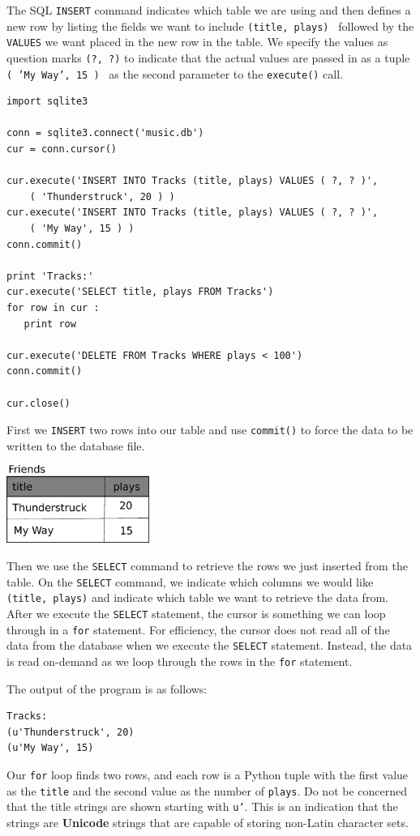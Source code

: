 \documentclass[10pt]{book}
\begin{document}
The SQL {\tt INSERT} command indicates which table we are using 
and then defines a new row by listing the fields we want to 
include {\tt (title, plays) } followed by the {\tt VALUES} we want
placed in the new row in the table.   We specify the values
as question marks {\tt (?, ?)} to indicate that the actual 
values are passed in as a tuple {\tt ( 'My Way', 15 ) } as the
second parameter to the {\tt execute()} call.

\beforeverb
\begin{verbatim}
import sqlite3

conn = sqlite3.connect('music.db')
cur = conn.cursor()

cur.execute('INSERT INTO Tracks (title, plays) VALUES ( ?, ? )', 
    ( 'Thunderstruck', 20 ) )
cur.execute('INSERT INTO Tracks (title, plays) VALUES ( ?, ? )', 
    ( 'My Way', 15 ) )
conn.commit()

print 'Tracks:'
cur.execute('SELECT title, plays FROM Tracks')
for row in cur :
   print row

cur.execute('DELETE FROM Tracks WHERE plays < 100')
conn.commit()

cur.close()
\end{verbatim}
\afterverb
%
First we {\tt INSERT} two rows into our table and use {\tt commit()} 
to force the data to be written to the database file.

\beforefig
\centerline{\includegraphics[height=1.00in]{figs2/tracks.eps}}
\afterfig

Then we use the {\tt SELECT} command
to retrieve the rows we just inserted from the table.  
On the 
{\tt SELECT} command, we indicate which columns we would like {\tt (title, plays)}
and indicate which table we want to retrieve the data from.  After we 
execute the {\tt SELECT} statement, the cursor is something we can loop through
in a {\tt for} statement.   For efficiency,
the cursor does not read all of the data from the
database when we execute the {\tt SELECT} statement.  
Instead, the data is read on-demand
as we loop through the rows in the {\tt for} statement.

The output of the program is as follows:

\beforeverb
\begin{verbatim}
Tracks:
(u'Thunderstruck', 20)
(u'My Way', 15)
\end{verbatim}
\afterverb
%
Our {\tt for} loop finds two rows, and each row is a Python tuple with the
first value as the {\tt title} and the second value as the number of {\tt plays}.
Do not be concerned that the title strings are shown starting with 
{\tt u'}.  This is an indication that the strings are {\bf Unicode} strings
that are capable of storing non-Latin character sets.
\end{document}

